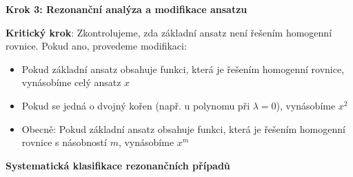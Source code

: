 \vspace{1\baselineskip}

\noindent\textbf{Krok 3: Rezonanční analýza a modifikace ansatzu}

\textbf{Kritický krok}: Zkontrolujeme, zda základní ansatz není řešením homogenní rovnice. Pokud ano, provedeme modifikaci:

\begin{itemize}
\item Pokud základní ansatz obsahuje funkci, která je řešením homogenní rovnice, vynásobíme celý ansatz $x$
\item Pokud se jedná o dvojný kořen (např. u polynomu při $\lambda = 0$), vynásobíme $x^2$
\item Obecně: Pokud základní ansatz obsahuje funkci, která je řešením homogenní rovnice s násobností $m$, vynásobíme $x^m$
\end{itemize}

\vspace{1\baselineskip}

\noindent\textbf{Systematická klasifikace rezonančních případů}


